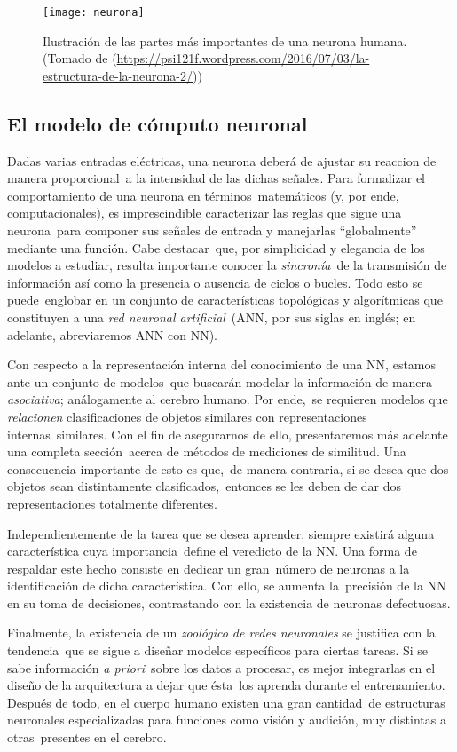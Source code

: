 \begin{figure}[H]
  \centering
  \texttt{[image: neurona]}
  \caption{Ilustración de las partes más importantes de una neurona humana.
    (Tomado de (\url{https://psi121f.wordpress.com/2016/07/03/la-estructura-de-la-neurona-2/}))}
\end{figure}


\subsection{El modelo de cómputo neuronal}

Dadas varias entradas eléctricas, una neurona deberá de ajustar su reaccion de manera proporcional\
a la intensidad de las dichas señales. Para formalizar el comportamiento de una neurona en términos\
matemáticos (y, por ende, computacionales), es imprescindible caracterizar las reglas que sigue una neurona\
para componer sus señales de entrada y manejarlas ``globalmente'' mediante una función. Cabe destacar\
que, por simplicidad y elegancia de los modelos a estudiar, resulta importante conocer la \emph{sincronía}\
de la transmisión de información así como la presencia o ausencia de ciclos o bucles. Todo esto se puede\
englobar en un conjunto de características topológicas y algorítmicas que constituyen a una \emph{red neuronal artificial}\
(ANN, por sus siglas en inglés; en adelante, abreviaremos ANN con NN).\par
Con respecto a la representación interna del conocimiento de una NN, estamos ante un conjunto de modelos\
que buscarán modelar la información de manera \emph{asociativa}; análogamente al cerebro humano. Por ende,\
se requieren modelos que \emph{relacionen} clasificaciones de objetos similares con representaciones internas\
similares. Con el fin de asegurarnos de ello, presentaremos más adelante una completa sección\
acerca de métodos de mediciones de similitud. Una consecuencia importante de esto es que,\
de manera contraria, si se desea que dos objetos sean distintamente clasificados,\
entonces se les deben de dar dos representaciones totalmente diferentes.\par
Independientemente de la tarea que se desea aprender, siempre existirá alguna característica cuya importancia\
define el veredicto de la NN. Una forma de respaldar este hecho consiste en dedicar un gran\
número de neuronas a la identificación de dicha característica. Con ello, se aumenta la\
precisión de la NN en su toma de decisiones, contrastando con la existencia de neuronas defectuosas.\par
Finalmente, la existencia de un \emph{zoológico de redes neuronales} se justifica con la tendencia\
que se sigue a diseñar modelos específicos para ciertas tareas. Si se sabe información \textit{a priori}\
sobre los datos a procesar, es mejor integrarlas en el diseño de la arquitectura a dejar que ésta\
los aprenda durante el entrenamiento. Después de todo, en el cuerpo humano existen una gran cantidad\
de estructuras neuronales especializadas para funciones como visión y audición, muy distintas a otras\
presentes en el cerebro.

